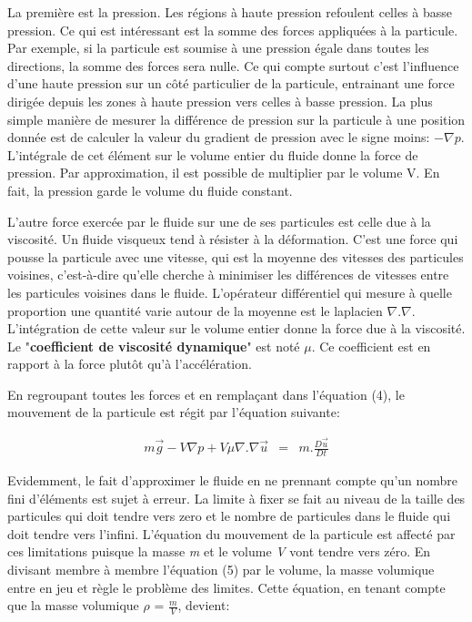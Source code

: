 \documentclass[11pt]{report}
\begin{document}
La première est la pression. Les régions à haute pression refoulent celles à basse pression. Ce qui est intéressant est la somme des forces appliquées à la particule. Par exemple, si la particule est soumise à une pression égale dans toutes les directions, la somme des forces sera nulle. Ce qui compte surtout c'est l'influence d'une haute pression sur un côté particulier de la particule, entrainant une force dirigée depuis les zones à haute pression vers celles à basse pression. La plus simple manière de mesurer la différence de pression sur la particule à une position donnée est de calculer la valeur du gradient de pression avec le signe moins: $ - \nabla p $.
L'intégrale de cet élément sur le volume entier du fluide donne la force de pression. Par approximation, il est possible de multiplier par le volume V. En fait, la pression garde le volume du fluide constant.\newline

L'autre force exercée par le fluide sur une de ses particules est celle due à la viscosité. Un fluide visqueux tend à résister à la déformation. C'est une force qui pousse la particule avec une vitesse, qui est la moyenne des vitesses des particules voisines, c'est-à-dire qu'elle cherche à minimiser les différences de vitesses entre les particules voisines dans le fluide. L'opérateur différentiel qui mesure à quelle proportion une quantité varie autour de la moyenne est le laplacien $ \nabla . \nabla $. L'intégration de cette valeur sur le volume entier donne la force due à la viscosité. Le "\textbf{coefficient de viscosité dynamique}" est noté $ \mu $. Ce coefficient est en rapport à la force plutôt qu'à l'accélération.\newline

En regroupant toutes les forces et en remplaçant dans l'équation (4), le mouvement de la particule est régit par l'équation suivante:

\begin{eqnarray}
m\overrightarrow{g} - V \nabla p + V \mu \nabla . \nabla \overrightarrow{u} & = & m. \frac{D \overrightarrow{u}}{Dt}
\end{eqnarray}

Evidemment, le fait d'approximer le fluide en ne prennant compte qu'un nombre fini d'éléments est sujet à erreur. La limite à fixer se fait au niveau de la taille des particules qui doit tendre vers zero et le nombre de particules dans le fluide qui doit tendre vers l'infini. L'équation du mouvement de la particule est affecté par ces limitations puisque la masse \textit{m} et le volume \textit{V} vont tendre vers zéro.
En divisant membre à membre l'équation (5) par le volume, la masse volumique entre en jeu et règle le problème des limites. Cette équation, en tenant compte que la masse volumique $ \rho $ = $ \frac{m}{V} $, devient:
\end{document}
